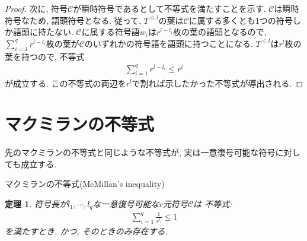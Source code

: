 \documentclass[12pt]{ltjsarticle}
\newtheorem{theorem}{定理}
\begin{document}
\begin{proof}
  次に, 符号$\mathcal{C}$が瞬時符号であるとして不等式を満たすことを示す.
  $\mathcal{C}$は瞬時符号なため, 語頭符号となる.
  従って, $T^{\leq l}$の葉は$\mathcal{C}$に属する多くとも1つの符号しか語頭に持たない.
  $\mathcal{C}$に属する符号語$w_i$は$r^{l - l_i}$枚の葉の語頭となるので,
  $\sum_{i = 1}^q r^{l - l_i}$枚の葉が$\mathcal{C}$のいずれかの符号語を語頭に持つことになる.
  $T^{\leq l}$は$r^l$枚の葉を持つので, 不等式
  \begin{align*}
    \sum_{i = 1}^q r^{l - l_i} \leq r^l
  \end{align*}
  が成立する.
  この不等式の両辺を$r^l$で割れば示したかった不等式が導出される.
\end{proof}

\section{マクミランの不等式}
先のマクミランの不等式と同じような不等式が, 実は一意復号可能な符号に対しても成立する.
\begin{itembox}[l]{マクミランの不等式(McMillan's inequality)}
  \begin{theorem}
    符号長が$l_1, \cdots, l_q$な一意復号可能な$r$元符号$\mathcal{C}$は
    不等式:
    \begin{align*}
      \sum_{i = 1}^q \frac{1}{r^{l_i}} \leq 1
    \end{align*}
    を満たすとき, かつ, そのときのみ存在する.
  \end{theorem}
\end{itembox}
\end{document}

